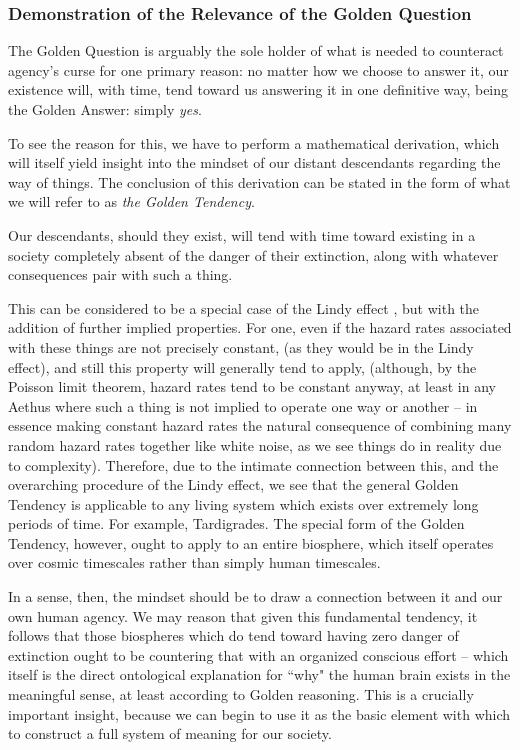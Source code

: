 \subsubsection{Demonstration of the Relevance of the Golden Question}

The Golden Question is arguably the sole holder of what is needed to counteract agency's curse for one primary reason: no matter how we choose to answer it, our existence will, with time, tend toward us answering it in one definitive way, being the Golden Answer: simply \textit{yes}. 

To see the reason for this, we have to perform a mathematical derivation, which will itself yield insight into the mindset of our distant descendants regarding the way of things. The conclusion of this derivation can be stated in the form of what we will refer to as \textit{the Golden Tendency}.
\begin{prince}
Our descendants, should they exist, will tend with time toward existing in a society completely absent of the danger of their extinction, along with whatever consequences pair with such a thing.
\end{prince}
This can be considered to be a special case of the Lindy effect \cite{Taleb_Nassim_Nicholas2012-11-27}, but with the addition of further implied properties. For one, even if the hazard rates associated with these things are not precisely constant, (as they would be in the Lindy effect), and still this property will generally tend to apply, (although, by the Poisson limit theorem, hazard rates tend to be constant anyway, at least in any Aethus where such a thing is not implied to operate one way or another -- in essence making constant hazard rates the natural consequence of combining many random hazard rates together like white noise, as we see things do in reality due to complexity). Therefore, due to the intimate connection between this, and the overarching procedure of the Lindy effect, we see that the general Golden Tendency is applicable to any living system which exists over extremely long periods of time. For example, Tardigrades. The special form of the Golden Tendency, however, ought to apply to an entire biosphere, which itself operates over cosmic timescales rather than simply human timescales. 

In a sense, then, the mindset should be to draw a connection between it and our own human agency. We may reason that given this fundamental tendency, it follows that those biospheres which do tend toward having zero danger of extinction ought to be countering that with an organized conscious effort -- which itself is the direct ontological explanation for ``why" the human brain exists in the meaningful sense, at least according to Golden reasoning. This is a crucially important insight, because we can begin to use it as the basic element with which to construct a full system of meaning for our society. 

